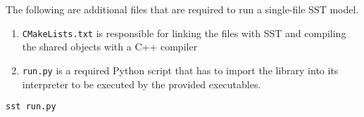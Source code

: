 The following are additional files that are required to run a single-file SST model.

\begin{enumerate}
    \item \texttt{CMakeLists.txt} is responsible for linking the files with SST and compiling the shared objects with a C++ compiler
    \item \texttt{run.py} is a required Python script that has to import the library into its interpreter to be executed by the provided executables.
\end{enumerate}

\begin{lstlisting}[caption=A typical method to run the user's model in the SST framework,style=base]
sst run.py
\end{lstlisting}
\newpage
